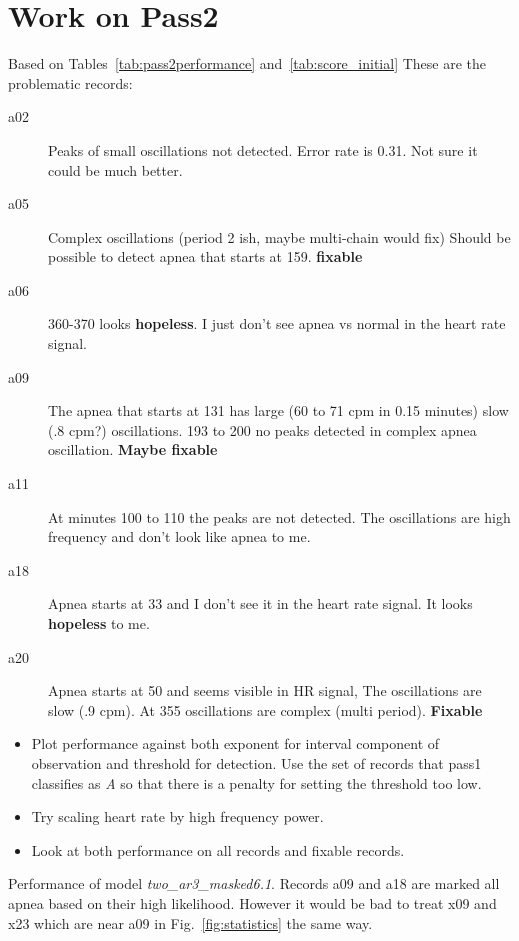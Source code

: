 \documentclass[12pt]{article}
\begin{document}
\section{Work on Pass2}
\label{sec:pass2}

Based on Tables~\ref{tab:pass2performance} and~\ref{tab:score_initial}
These are the problematic records:
\begin{description}
\item[a02] Peaks of small oscillations not detected.  Error rate is
  0.31.  Not sure it could be much better.
\item[a05] Complex oscillations (period 2 ish, maybe multi-chain would
  fix) Should be possible to detect apnea that starts at 159.
  \textbf{fixable}
\item[a06] 360-370 looks \textbf{hopeless}.  I just don't see apnea vs
  normal in the heart rate signal.
\item[a09] The apnea that starts at 131 has large (60 to 71 cpm in
  0.15 minutes) slow (.8 cpm?) oscillations.  193 to 200 no peaks
  detected in complex apnea oscillation.  \textbf{Maybe fixable}
\item[a11] At minutes 100 to 110 the peaks are not detected.  The
  oscillations are high frequency and don't look like apnea to me.
\item[a18] Apnea starts at 33 and I don't see it in the heart rate
  signal.  It looks \textbf{hopeless} to me.
\item[a20] Apnea starts at 50 and seems visible in HR signal,  The
  oscillations are slow (.9 cpm).  At 355 oscillations are complex
  (multi period).  \textbf{Fixable}
\end{description}
\begin{itemize}
\item Plot performance against both exponent for interval component of
  observation and threshold for detection.  Use the set of records
  that pass1 classifies as \emph{A} so that there is a penalty for
  setting the threshold too low.
\item Try scaling heart rate by high frequency power.
\item Look at both performance on all records and fixable records.
\end{itemize}

\begin{table*}
  \centering
  
  \caption[Performance]{Performance of model
    \emph{two\_ar3\_masked6.1}.  Records a09 and a18 are marked all
    apnea based on their high likelihood.  However it would be bad to
    treat x09 and x23 which are near
    a09 in Fig.~\ref{fig:statistics} the same way.}
  \label{tab:pass2performance}
\end{table*}
\end{document}
